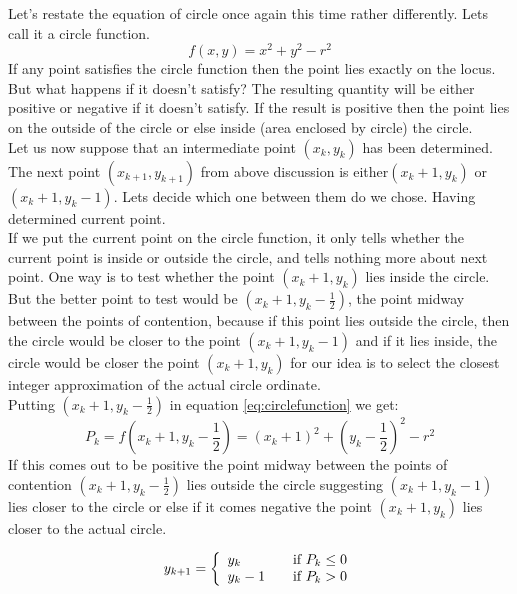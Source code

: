 \documentclass[a4paper,12pt,oneside]{book}
\begin{document}
 Let's restate the equation of circle once again this time rather differently. Lets call it a circle function.
 \begin{equation} \label{eq:circlefunction}
 	f(x,y)=x^2+y^2-r^2
 \end{equation}
  If any point satisfies the circle function then the point lies exactly on the locus. But what happens if it doesn't satisfy? The resulting quantity will be either positive or negative if it doesn't satisfy. If the result  is positive then the point lies on the outside of the circle or else inside (area enclosed by circle) the circle.\\
  Let us now suppose that an intermediate point $(x_k,y_k)$ has been determined. The next point  $(x_{k+1},y_{k+1})$ from above discussion is either$(x_k+1,y_k)$ or $ (x_k+1,y_k-1)$. Lets decide which one between them do we chose. Having determined current point.\\
   If we put the current point on the circle function, it only tells whether the current point is inside or outside the circle, and tells nothing more about next point. One way is to test whether the point $(x_k+1,y_k)$ lies inside the circle. But the better point to test would be $(x_k+1,y_k-\frac{1}{2})$, the point midway between the points of contention, because if this point lies outside the circle, then the circle would be closer to the point $(x_k+1,y_k-1)$ and if it lies inside, the circle  would be closer the point $(x_k+1,y_k)$ for our idea is to select the closest integer approximation of the actual circle ordinate.\\
   Putting $(x_k+1,y_k-\frac{1}{2})$ in equation \ref{eq:circlefunction} we get:
\begin{equation} \label{eq:decisioncircle}
	P_k=f(x_k+1,y_k-\frac{1}{2})=(x_k+1)^2+(y_k-\frac{1}{2})^2-r^2
\end{equation}
If this comes out to be positive the point midway between the points of contention $(x_k+1,y_k-\frac{1}{2})$ lies outside the circle suggesting $(x_k+1,y_k-1)$ lies closer to the circle or else if it comes negative the point $(x_k+1,y_k)$ lies closer to the actual circle. 
 \begin{center}
	\begin{equation}
		y_{k+1}= \left\{
					\begin{array}{l l}
						y_k & \quad \text{if $P_k \leq 0$}\\
						y_k-1 & \quad \text{if $P_k>0$}
					\end{array}
				\right.
	\end{equation}
\end{center}
 
\end{document}
